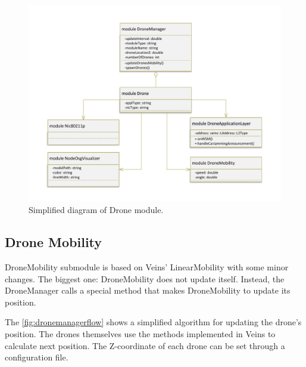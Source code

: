 \documentclass[]{nsm-thesis}
\begin{document}
\begin{figure}
	\centering
	\includegraphics[width=1\textwidth]{figures/Drone.pdf}
	\caption{Simplified diagram of Drone module.}
	\label{fig:dronened}
\end{figure}



\subsection{Drone Mobility}

DroneMobility submodule is based on Veins' LinearMobility with some minor changes. The biggest one: DroneMobility does not update itself. Instead, the DroneManager calls a special method that makes DroneMobility to update its position.

The \cref{fig:dronemanagerflow} shows a simplified algorithm for updating the drone's position. The drones themselves use the methods implemented in Veins to calculate next position. The Z-coordinate of each drone can be set through a configuration file.
\end{document}
